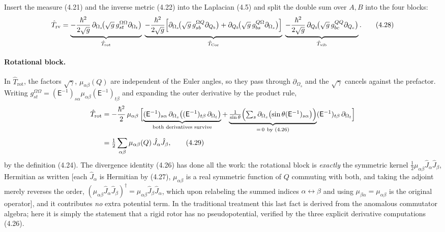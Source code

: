 Insert the measure (4.21) and the inverse metric (4.22) into the Laplacian (4.5) and split the double sum over $A,B$ into the four blocks:
\begin{equation}
\hat T_{\mathrm{rv}}
=\underbrace{-\frac{\hbar^{2}}{2\sqrt g}\,\partial_{\Omega_s}\!\bigl(\sqrt g\,g^{\Omega\Omega}_{st}\partial_{\Omega_t}\bigr)}_{\hat T_{\mathrm{rot}}}
\;\underbrace{-\frac{\hbar^{2}}{2\sqrt g}\Bigl[\partial_{\Omega_s}\!\bigl(\sqrt g\,g^{\Omega Q}_{sb}\partial_{Q_b}\bigr)+\partial_{Q_b}\!\bigl(\sqrt g\,g^{Q\Omega}_{bs}\partial_{\Omega_s}\bigr)\Bigr]}_{\hat T_{\mathrm{Cor}}}
\;\underbrace{-\frac{\hbar^{2}}{2\sqrt g}\,\partial_{Q_b}\!\bigl(\sqrt g\,g^{QQ}_{bc}\partial_{Q_c}\bigr)}_{\hat T_{\mathrm{vib}}} . \tag{4.28}
\end{equation}

\paragraph{Rotational block.}
In $\hat T_{\mathrm{rot}}$, the factors $\sqrt\gamma$, $\mu_{\alpha\beta}(Q)$ are independent of the Euler angles, so they pass through $\partial_{\Omega_s}$ and the $\sqrt\gamma$ cancels against the prefactor. Writing $g^{\Omega\Omega}_{st}=(\mathsf E^{-1})_{s\alpha}\mu_{\alpha\beta}(\mathsf E^{-1})_{t\beta}$ and expanding the outer derivative by the product rule,
\begin{align}
\hat T_{\mathrm{rot}}
&=-\frac{\hbar^{2}}{2}\,\mu_{\alpha\beta}\,\Bigl[\underbrace{(\mathsf E^{-1})_{s\alpha}\,\partial_{\Omega_s}\bigl((\mathsf E^{-1})_{t\beta}\,\partial_{\Omega_t}\bigr)}_{\text{both derivatives survive}}
+\underbrace{\tfrac{1}{\sin\theta}\Bigl(\textstyle\sum_s\partial_{\Omega_s}\bigl(\sin\theta(\mathsf E^{-1})_{s\alpha}\bigr)\Bigr)}_{=\,0\ \text{by (4.26)}}(\mathsf E^{-1})_{t\beta}\,\partial_{\Omega_t}\Bigr]\nonumber\\[2pt]
&=\tfrac12\sum_{\alpha\beta}\mu_{\alpha\beta}(Q)\,\hat J_\alpha\hat J_\beta ,
\tag{4.29}
\end{align}
by the definition (4.24). The divergence identity (4.26) has done all the work: the rotational block is \emph{exactly} the symmetric kernel $\tfrac12\mu_{\alpha\beta}\hat J_\alpha\hat J_\beta$, Hermitian as written [each $\hat J_\alpha$ is Hermitian by (4.27), $\mu_{\alpha\beta}$ is a real symmetric function of $Q$ commuting with both, and taking the adjoint merely reverses the order, $(\mu_{\alpha\beta}\hat J_\alpha\hat J_\beta)^{\dagger}=\mu_{\alpha\beta}\hat J_\beta\hat J_\alpha$, which upon relabeling the summed indices $\alpha\leftrightarrow\beta$ and using $\mu_{\beta\alpha}=\mu_{\alpha\beta}$ is the original operator], and it contributes \emph{no} extra potential term. In the traditional treatment this last fact is derived from the anomalous commutator algebra; here it is simply the statement that a rigid rotor has no pseudopotential, verified by the three explicit derivative computations (4.26).

